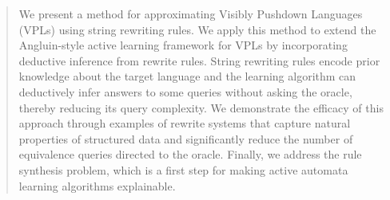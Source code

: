 \begin{abstract}
We present a method for approximating Visibly Pushdown Languages (VPLs) using string rewriting rules. 
We apply this method to extend the Angluin-style active learning framework for VPLs by incorporating deductive inference from rewrite rules. 
String rewriting rules encode prior knowledge about the target language and  
the learning algorithm can deductively infer answers to some queries without asking the oracle, 
thereby reducing its query complexity.
We demonstrate the efficacy of this approach through examples of rewrite systems that capture natural properties of structured data
and significantly reduce the number of equivalence queries directed to the oracle. 
Finally, we address the rule synthesis problem,  which is a first step for making active automata learning algorithms explainable.
\end{abstract}

